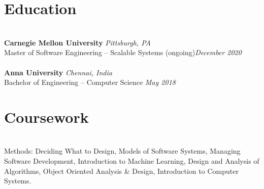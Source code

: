\documentclass{resume}
\author{https://aravindvasu.dev}{Aravind Vasudevan}
\begin{document}
\maketitle
\section*{Education}
\titlerule
\noindent
\\
\textbf{Carnegie Mellon University} \hfill \textit{Pittsburgh, PA} \\
{\small Master of Software Engineering -- Scalable Systems} (ongoing)\hfill \textit{\small December 2020}  \\
\\
\textbf{Anna University} \hfill \textit{Chennai, India} \\
{\small Bachelor of Engineering -- Computer Science} \hfill \textit{\small May 2018}

\section*{Coursework}
\titlerule
\noindent
\\
Methods: Deciding What to Design, Models of Software Systems, Managing Software Development, Introduction to Machine Learning, Design and Analysis of Algorithms, Object Oriented Analysis \& Design, Introduction to Computer Systems.
\end{document}
